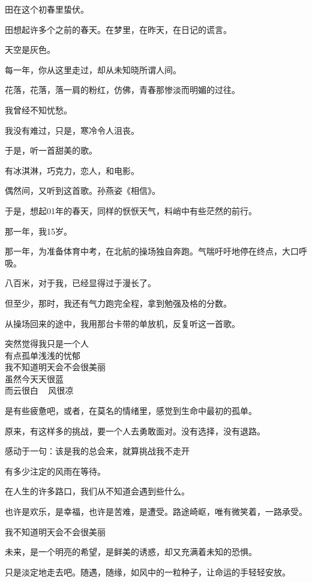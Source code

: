 \documentclass[12pt,a4paper]{article}
\begin{document}
		田在这个初春里蛰伏。\par
		田想起许多个之前的春天。在梦里，在昨天，在日记的谎言。\par
		天空是灰色。\par
		每一年，你从这里走过，却从未知晓所谓人间。\par
		花落，花落，落一肩的粉红，仿佛，青春那惨淡而明媚的过往。\par
		我曾经不知忧愁。

		我没有难过，只是，寒冷令人沮丧。\par
		于是，听一首甜美的歌。\par
		有冰淇淋，巧克力，恋人，和电影。

	\endwriting



		偶然间，又听到这首歌。孙燕姿《相信》。\par
		于是，想起01年的春天，同样的恹恹天气，料峭中有些茫然的前行。\par
		那一年，我15岁。\par
		那一年，为准备体育中考，在北航的操场独自奔跑。气喘吁吁地停在终点，大口呼吸。\par
		八百米，对于我，已经显得过于漫长了。\par
		但至少，那时，我还有气力跑完全程，拿到勉强及格的分数。\par
		从操场回来的途中，我用那台卡带的单放机，反复听这一首歌。

		\longpoem{}{}{}
		突然觉得我只是一个人 \\
		有点孤单浅浅的忧郁 \\
		我不知道明天会不会很美丽 \\
		虽然今天天很蓝 \\
		而云很白 ~ 风很凉
		\endlongpoem

		是有些疲惫吧，或者，在莫名的情绪里，感觉到生命中最初的孤单。\par
		原来，有这样多的挑战，要一个人去勇敢面对。没有选择，没有退路。\par
		感动于一句：该是我的总会来，就算挑战我不走开

		有多少注定的风雨在等待。\par
		在人生的许多路口，我们从不知道会遇到些什么。\par
		也许是欢乐，是幸福，也许是苦难，是遭受。路途崎岖，唯有微笑着，一路承受。

		我不知道明天会不会很美丽

		未来，是一个明亮的希望，是鲜美的诱惑，却又充满着未知的恐惧。\par
		只是淡定地走去吧。随遇，随缘，如风中的一粒种子，让命运的手轻轻安放。
\end{document}
